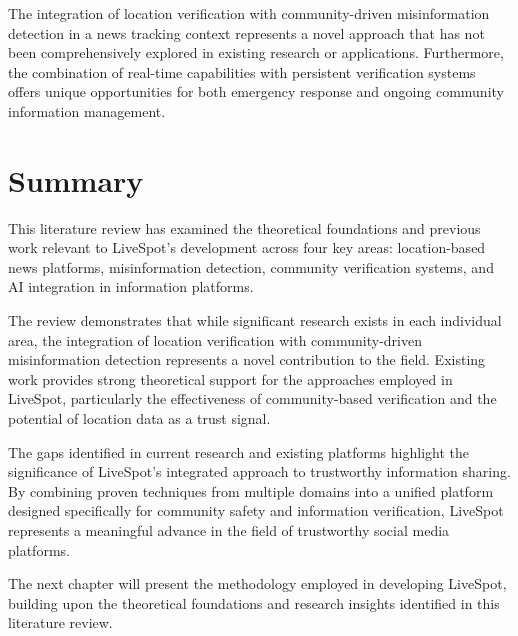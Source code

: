 The integration of location verification with community-driven misinformation detection in a news tracking context represents a novel approach that has not been comprehensively explored in existing research or applications. Furthermore, the combination of real-time capabilities with persistent verification systems offers unique opportunities for both emergency response and ongoing community information management.

\section{Summary}
\label{sec:lit_review_summary}

This literature review has examined the theoretical foundations and previous work relevant to LiveSpot's development across four key areas: location-based news platforms, misinformation detection, community verification systems, and AI integration in information platforms.

The review demonstrates that while significant research exists in each individual area, the integration of location verification with community-driven misinformation detection represents a novel contribution to the field. Existing work provides strong theoretical support for the approaches employed in LiveSpot, particularly the effectiveness of community-based verification and the potential of location data as a trust signal.

The gaps identified in current research and existing platforms highlight the significance of LiveSpot's integrated approach to trustworthy information sharing. By combining proven techniques from multiple domains into a unified platform designed specifically for community safety and information verification, LiveSpot represents a meaningful advance in the field of trustworthy social media platforms.

The next chapter will present the methodology employed in developing LiveSpot, building upon the theoretical foundations and research insights identified in this literature review.
